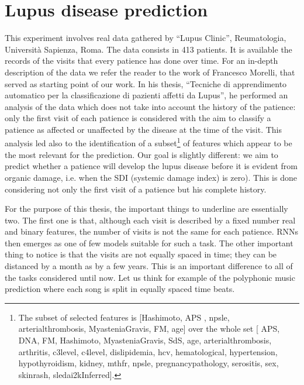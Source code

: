 \section{Lupus disease prediction}

This experiment involves real data gathered by ``Lupus Clinic'', Reumatologia, Università Sapienza, Roma. The data consists in 413 patients. It is available the records of the visits that every patience has done over time. For an in-depth description of the data we refer the reader to the work of Francesco Morelli, that served as starting point of our work. In his thesis, ``Tecniche di apprendimento automatico per la classificazione di pazienti affetti da Lupus'', he performed an analysis of the data which does not take into account the history of the patience: only the first visit of each patience is considered with the aim to classify a patience as affected or unaffected by the disease at the time of the visit. This analysis led also to the identification of a subset\footnote{The subset of selected features is [Hashimoto, APS , npsle, arterialthrombosis, MyasteniaGravis, FM, age] over the whole set [ APS, DNA, FM, Hashimoto, MyasteniaGravis, SdS, age, arterialthrombosis, arthritis, c3level, c4level, dislipidemia, hcv, hematological, hypertension, hypothyroidism, kidney, mthfr, npsle, pregnancypathology, serositis, sex, skinrash, sledai2kInferred].} of features which appear to be the most relevant for the prediction. Our goal is slightly different: we aim to predict whether a patience will develop the lupus disease before it is evident from organic damage, i.e. when the SDI (systemic damage index) is zero). This is done considering not only the first visit of a patience but his complete history.

For the purpose of this thesis, the important things to underline are essentially two. The first one is that,  although each visit is described by a fixed number real and binary features, the number of visits  is not the same for each patience. RNNs then emerges as one of few models suitable for such a task. The other important thing to notice is that the visits are not equally spaced in time; they can be distanced by a month as by a few years. This is an important difference to all of the tasks considered until now. Let us think for example of the polyphonic music prediction where each song is split in equally spaced time beats.

